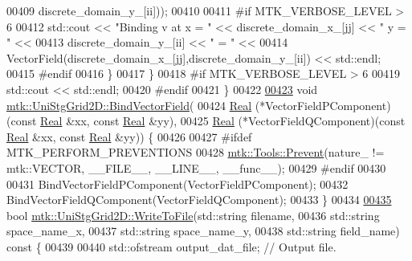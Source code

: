 \begin{DoxyCode}
00409                                             discrete\_domain\_y\_[ii]));
00410 
00411 \textcolor{preprocessor}{      #if MTK\_VERBOSE\_LEVEL > 6}
00412       std::cout << \textcolor{stringliteral}{"Binding v at x = "} << discrete\_domain\_x\_[jj] << \textcolor{stringliteral}{" y = "} <<
00413         discrete\_domain\_y\_[ii] << \textcolor{stringliteral}{" = "} <<
00414         VectorField(discrete\_domain\_x\_[jj],discrete\_domain\_y\_[ii]) << std::endl;
00415 \textcolor{preprocessor}{      #endif}
00416     \}
00417   \}
00418 \textcolor{preprocessor}{  #if MTK\_VERBOSE\_LEVEL > 6}
00419   std::cout << std::endl;
00420 \textcolor{preprocessor}{  #endif}
00421 \}
00422 
\hypertarget{mtk__uni__stg__grid__2d_8cc_source_l00423}{}\hyperlink{classmtk_1_1UniStgGrid2D_ae274b24672e9bd6075bf38b015bd9083}{00423} \textcolor{keywordtype}{void} \hyperlink{classmtk_1_1UniStgGrid2D_ae274b24672e9bd6075bf38b015bd9083}{mtk::UniStgGrid2D::BindVectorField}(
00424   \hyperlink{group__c01-roots_gac080bbbf5cbb5502c9f00405f894857d}{Real} (*VectorFieldPComponent)(\textcolor{keyword}{const} \hyperlink{group__c01-roots_gac080bbbf5cbb5502c9f00405f894857d}{Real} &xx, \textcolor{keyword}{const} \hyperlink{group__c01-roots_gac080bbbf5cbb5502c9f00405f894857d}{Real} &yy),
00425   \hyperlink{group__c01-roots_gac080bbbf5cbb5502c9f00405f894857d}{Real} (*VectorFieldQComponent)(\textcolor{keyword}{const} \hyperlink{group__c01-roots_gac080bbbf5cbb5502c9f00405f894857d}{Real} &xx, \textcolor{keyword}{const} \hyperlink{group__c01-roots_gac080bbbf5cbb5502c9f00405f894857d}{Real} &yy)) \{
00426 
00427 \textcolor{preprocessor}{  #ifdef MTK\_PERFORM\_PREVENTIONS}
00428   \hyperlink{classmtk_1_1Tools_a332324c6f25e66be9dff48c5987a3b9f}{mtk::Tools::Prevent}(nature\_ != mtk::VECTOR, \_\_FILE\_\_, \_\_LINE\_\_, \_\_func\_\_);
00429 \textcolor{preprocessor}{  #endif}
00430 
00431   BindVectorFieldPComponent(VectorFieldPComponent);
00432   BindVectorFieldQComponent(VectorFieldQComponent);
00433 \}
00434 
\hypertarget{mtk__uni__stg__grid__2d_8cc_source_l00435}{}\hyperlink{classmtk_1_1UniStgGrid2D_a1787a79e4bcee6b89c681dc7e5e2d7bc}{00435} \textcolor{keywordtype}{bool} \hyperlink{classmtk_1_1UniStgGrid2D_a1787a79e4bcee6b89c681dc7e5e2d7bc}{mtk::UniStgGrid2D::WriteToFile}(std::string filename,
00436                                     std::string space\_name\_x,
00437                                     std::string space\_name\_y,
00438                                     std::string field\_name)\textcolor{keyword}{ const }\{
00439 
00440   std::ofstream output\_dat\_file;  \textcolor{comment}{// Output file.}

\end{DoxyCode}
